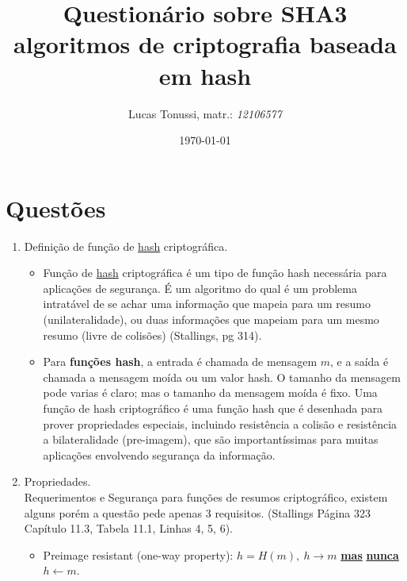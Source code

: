 \documentclass[12pt, a4paper]{article}
\title {
  Questionário sobre SHA3 algoritmos de criptografia baseada em hash
}
\author {
  Lucas Tonussi, matr.: \textit{12106577}
}
\date{
  \today
}
\begin{document}
\maketitle

\section{Questões}

\begin{enumerate}

\item Definição de função de \underline{hash} criptográfica.\\

  \begin{itemize}

    \item Função de \underline{hash} criptográfica é um tipo de função hash
    necessária para aplicações de segurança. É um algoritmo do qual é um
    problema intratável de se achar uma informação que mapeia para um resumo
    (unilateralidade), ou duas informações que mapeiam para um mesmo resumo
    (livre de colisões) (Stallings, pg 314).\\

    \item Para \textbf{funções hash}, a entrada é chamada de mensagem $m$, e a
    saída é chamada a mensagem moída ou um valor hash. O tamanho da mensagem
    pode varias é claro; mas o tamanho da mensagem moída é fixo. Uma função de
    hash criptográfico é uma função hash que é desenhada para prover
    propriedades especiais, incluindo resistência a colisão e resistência a
    bilateralidade (pre-imagem), que são importantíssimas para muitas aplicações
    envolvendo segurança da informação.\\

  \end{itemize}

\item Propriedades.\\

Requerimentos e Segurança para funções de resumos criptográfico, existem alguns
porém a questão pede apenas 3  requisitos. (Stallings Página 323 Capítulo 11.3,
Tabela 11.1,  Linhas 4, 5, 6).\\

  \begin{itemize}
    \label{tiposataque}
    \item Preimage resistant (one-way property): $h = H(m),\ h \rightarrow m$
    \underline{\color{red} \textbf{mas}} \underline{\color{red} \textbf{nunca}}
    $h \leftarrow m$.\\


\end{itemize}
\end{enumerate}
\end{document}
